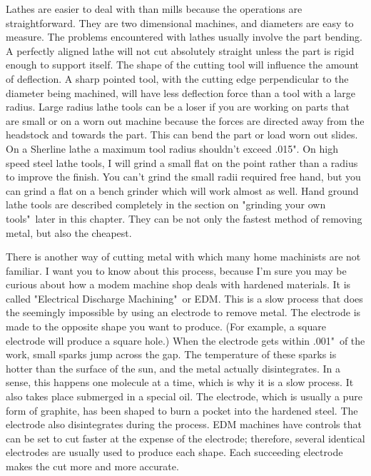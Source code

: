 
Lathes are easier to deal with than mills because the operations are
straightforward. They are two dimensional machines, and diameters are easy to
measure. The problems encountered with lathes usually involve the part bending.
A perfectly aligned lathe will not cut absolutely straight unless the part is
rigid enough to support itself. The shape of the cutting tool will influence the
amount of deflection. A sharp pointed tool, with the cutting edge perpendicular
to the diameter being machined, will have less deflection force than a tool with
a large radius. Large radius lathe tools can be a loser if you are working on
parts that are small or on a worn out machine because the forces are directed
away from the headstock and towards the part. This can bend the part or load
worn out slides. On a Sherline lathe a maximum tool radius shouldn't exceed
.015". On high speed steel lathe tools, I will grind a small flat on the point
rather than a radius to improve the finish. You can't grind the small radii
required free hand, but you can grind a flat on a bench grinder which will work
almost as well. Hand ground lathe tools are described completely in the section
on "grinding your own tools"\ later in this chapter. They can be not only the
fastest method of removing metal, but also the cheapest.


There is another way of cutting metal with which many home machinists are not
familiar. I want you to know about this process, because I'm sure you may be
curious about how a modem machine shop deals with hardened materials. It is
called "Electrical Discharge Machining"\ or EDM. This is a slow process that does
the seemingly impossible by using an electrode to remove metal. The electrode is
made to the opposite shape you want to produce. (For example, a square electrode
will produce a square hole.) When the electrode gets within .001"\ of the work,
small sparks jump across the gap. The temperature of these sparks is hotter than
the surface of the sun, and the metal actually disintegrates. In a sense, this
happens one molecule at a time, which is why it is a slow process. It also takes
place submerged in a special oil. The electrode, which is usually a pure form of
graphite, has been shaped to burn a pocket into the hardened steel. The
electrode also disintegrates during the process. EDM machines have controls that
can be set to cut faster at the expense of the electrode; therefore, several
identical electrodes are usually used to produce each shape. Each succeeding
electrode makes the cut more and more accurate.

